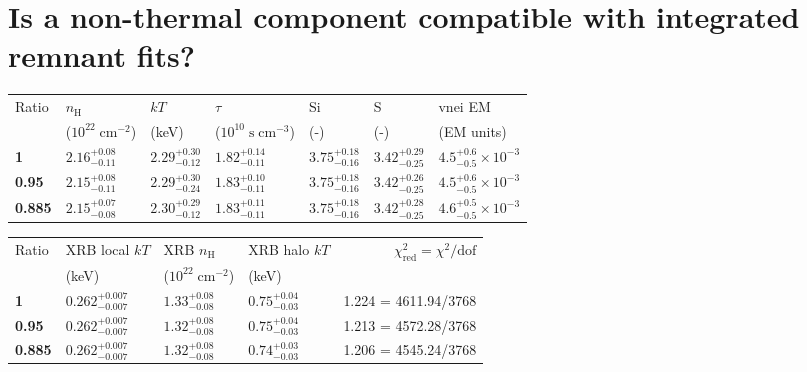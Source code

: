 \documentclass[preprint2,tighten,trackchanges]{aastex6}
\newcommand*{\mt}{\mathrm}
\newcommand*{\unit}[1]{\;\mt{#1}}  %
\begin{document}
\section{Is a non-thermal component compatible with integrated remnant fits?}

\begin{table*}[!h]
    \centering
    \caption{Power law and srcutlog fits \label{table:nonthermal-component}}

    \begin{tabular}{@{}lllllll@{}}
    \toprule
    Ratio & $n_\mathrm{H}$ & $kT$ & $\tau$ & Si & S & vnei EM \\
     & ($10^{22} \unit{cm^{-2}}$) & (keV) & ($10^{10} \unit{s\;cm^{-3}}$) & (-) & (-) & (EM units) \\
    \midrule
    \textbf{1}     & ${2.16}^{+0.08}_{-0.11}$ & ${2.29}^{+0.30}_{-0.12}$ & ${1.82}^{+0.14}_{-0.11}$
          & ${3.75}^{+0.18}_{-0.16}$ & ${3.42}^{+0.29}_{-0.25}$ & ${4.5}^{+0.6}_{-0.5} \times 10^{-3}$ \\
    \textbf{0.95}  & $2.15^{+0.08}_{-0.11}$ & $2.29^{+0.30}_{-0.24}$ & $1.83^{+0.10}_{-0.11}$  %
          & $3.75^{+0.18}_{-0.16}$ & $3.42^{+0.26}_{-0.25}$ & $4.5^{+0.6}_{-0.5} \times 10^{-3}$ \\ %
    \textbf{0.885} & ${2.15}^{+0.07}_{-0.08}$ & ${2.30}^{+0.29}_{-0.12}$ & ${1.83}^{+0.11}_{-0.11}$
          & ${3.75}^{+0.18}_{-0.16}$ & ${3.42}^{+0.28}_{-0.25}$ & ${4.6}^{+0.5}_{-0.5} \times 10^{-3}$ \\
    \bottomrule
    \end{tabular}

    \quad
    \quad

    \begin{tabular}{@{}llllr@{}}
    \toprule
    Ratio & XRB local $kT$ & XRB $n_\mathrm{H}$ & XRB halo $kT$
           & $\chi^2_{\mathrm{red}} = \chi^2/\mathrm{dof}$ \\
     & (keV) & ($10^{22} \unit{cm^{-2}}$) & (keV) &  \\
    \midrule
    \textbf{1} & ${0.262}^{+0.007}_{-0.007}$ & ${1.33}^{+0.08}_{-0.08}$ & ${0.75}^{+0.04}_{-0.03}$
          & 1.224 = 4611.94/3768 \\
    \textbf{0.95} & ${0.262}^{+0.007}_{-0.007}$ & $1.32^{+0.08}_{-0.08}$ & $0.75^{+0.04}_{-0.03}$ %
          & 1.213 = 4572.28/3768 \\
    \textbf{0.885} & ${0.262}^{+0.007}_{-0.007}$ & ${1.32}^{+0.08}_{-0.08}$ & ${0.74}^{+0.03}_{-0.03}$
          & 1.206 = 4545.24/3768 \\
    \bottomrule
    \end{tabular}
\end{table*}
\end{document}
